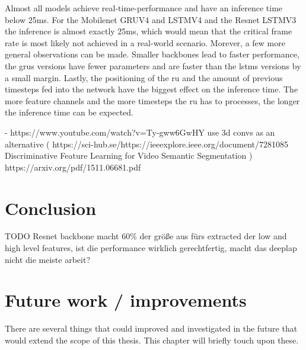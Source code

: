 \documentclass[11pt,
  paper=a4, 
  bibliography=totocnumbered,
	captions=tableheading,
	BCOR=10mm
]{scrreprt}
\theoremstyle{definition}
\begin{document}
Almost all models achieve real-time-performance and have an inference time below 25\gls{ms}.
For the Mobilenet GRUV4 and LSTMV4 and the Resnet LSTMV3 the inference is almost exactly 25\gls{ms}, which would mean that the critical frame rate is most likely not achieved in a real-world scenario.
Morever, a few more general observations can be made.
Smaller backbones lead to faster performance, the \glspl{gru} versions have fewer parameters and are faster than the \glspl{lstm} versions by a small margin.
Lastly, the positioning of the \gls{ru} and the amount of previous timesteps fed into the network have the biggest effect on the inference time.
The more feature channels and the more timesteps the \gls{ru} has to processes, the longer the inference time can be expected.


\newpage




- https://www.youtube.com/watch?v=Ty-gww6GwHY use 3d convs as an alternative ( https://sci-hub.se/https://ieeexplore.ieee.org/document/7281085 Discriminative Feature Learning for Video Semantic Segmentation ) https://arxiv.org/pdf/1511.06681.pdf



\chapter{Conclusion}

TODO Resnet backbone macht 60\% der größe aus fürs extracted der low and high level features, ist die performance wirklich gerechtfertig, macht das deeplap nicht die meiste arbeit?

\chapter{Future work / improvements}

There are several things that could improved and investigated in the future that would extend the scope of this thesis.
This chapter will briefly touch upon these.
\end{document}
